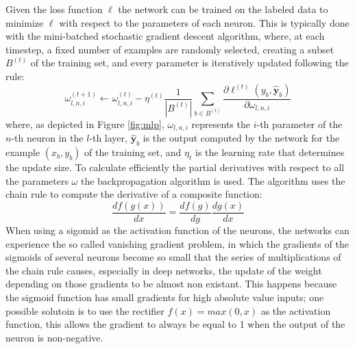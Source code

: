 \documentclass[12pt]{article}
\newcommand{\vect}[1]{\boldsymbol{#1}}
\begin{document}
Given the loss function $\ell$ the network can be trained on the labeled data to minimize $\ell$ with respect to the parameters of each neuron. This is typically done with the mini-batched stochastic gradient descent algorithm, where, at each timestep, a fixed number of examples are randomly selected,  creating a subset $B^{(t)}$ of the training set, and every parameter is iteratively updated following the rule:
\begin{equation}
\label{eq:sgd}
\omega_{l,n,i}^{(t+1)} \leftarrow \omega_{l,n,i}^{(t)} - \eta^{(t)}\frac{1}{|B^{(t)}|}\sum_{b \in B^{(t)}}{\frac{\partial \ell^{(t)}(y_b,\vect{\hat{y}}_b)}{\partial \omega_{l,n,i}}}
\end{equation}
where, as depicted in Figure \ref{fig:mlp}, $\omega_{l,n,i}$ represents the $i$-th parameter of the $n$-th neuron in the $l$-th layer, $\vect{\hat{y}}_b$ is the output computed by the network for the example $(x_b, y_b)$ of the training set, and $\eta_t$ is the learning rate that determines the update size. To calculate efficiently the partial derivatives with respect to all the parameters $\omega$ the backpropagation algorithm is used. The algorithm uses the chain rule to compute the derivative of a composite function:
$$
\frac{df(g(x))}{dx} = \frac{df(g)}{dg} \frac{dg(x)}{dx}
$$
When using a sigomid as the activation function of the neurons, the networks can experience the so called vanishing gradient problem, in which the gradients of the sigmoids of several neurons become so small that the series of multiplications of the chain rule causes, especially in deep networks, the update of the weight depending on those gradients to be almost non existant. This happens because the sigmoid function has small gradients for high absolute value inputs; one possible solutoin is to use the rectifier $f(x) = max(0,x)$ as the activation function, this allows the gradient to always be equal to 1 when the output of the neuron is non-negative.
\end{document}
